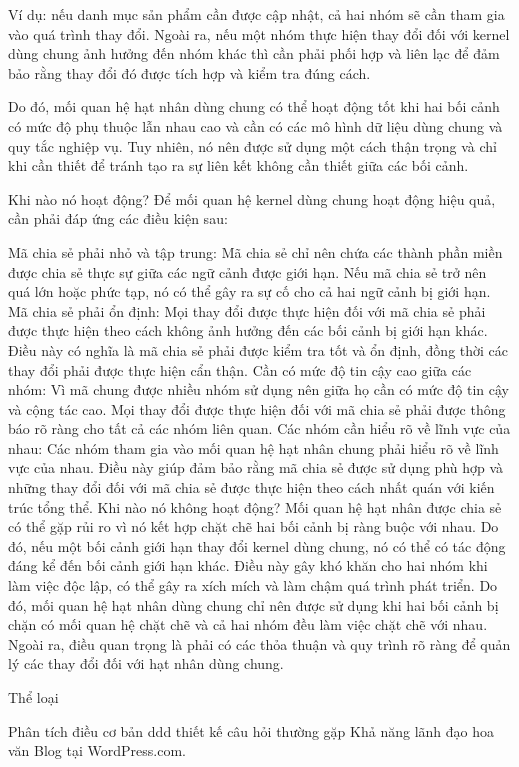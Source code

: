 Ví dụ: nếu danh mục sản phẩm cần được cập nhật, cả hai nhóm sẽ cần tham gia vào quá trình thay đổi. Ngoài ra, nếu một nhóm thực hiện thay đổi đối với kernel dùng chung ảnh hưởng đến nhóm khác thì cần phải phối hợp và liên lạc để đảm bảo rằng thay đổi đó được tích hợp và kiểm tra đúng cách.

Do đó, mối quan hệ hạt nhân dùng chung có thể hoạt động tốt khi hai bối cảnh có mức độ phụ thuộc lẫn nhau cao và cần có các mô hình dữ liệu dùng chung và quy tắc nghiệp vụ. Tuy nhiên, nó nên được sử dụng một cách thận trọng và chỉ khi cần thiết để tránh tạo ra sự liên kết không cần thiết giữa các bối cảnh.

Khi nào nó hoạt động?
Để mối quan hệ kernel dùng chung hoạt động hiệu quả, cần phải đáp ứng các điều kiện sau:

Mã chia sẻ phải nhỏ và tập trung: Mã chia sẻ chỉ nên chứa các thành phần miền được chia sẻ thực sự giữa các ngữ cảnh được giới hạn. Nếu mã chia sẻ trở nên quá lớn hoặc phức tạp, nó có thể gây ra sự cố cho cả hai ngữ cảnh bị giới hạn.
Mã chia sẻ phải ổn định: Mọi thay đổi được thực hiện đối với mã chia sẻ phải được thực hiện theo cách không ảnh hưởng đến các bối cảnh bị giới hạn khác. Điều này có nghĩa là mã chia sẻ phải được kiểm tra tốt và ổn định, đồng thời các thay đổi phải được thực hiện cẩn thận.
Cần có mức độ tin cậy cao giữa các nhóm: Vì mã chung được nhiều nhóm sử dụng nên giữa họ cần có mức độ tin cậy và cộng tác cao. Mọi thay đổi được thực hiện đối với mã chia sẻ phải được thông báo rõ ràng cho tất cả các nhóm liên quan.
Các nhóm cần hiểu rõ về lĩnh vực của nhau: Các nhóm tham gia vào mối quan hệ hạt nhân chung phải hiểu rõ về lĩnh vực của nhau. Điều này giúp đảm bảo rằng mã chia sẻ được sử dụng phù hợp và những thay đổi đối với mã chia sẻ được thực hiện theo cách nhất quán với kiến ​​trúc tổng thể.
Khi nào nó không hoạt động?
Mối quan hệ hạt nhân được chia sẻ có thể gặp rủi ro vì nó kết hợp chặt chẽ hai bối cảnh bị ràng buộc với nhau. Do đó, nếu một bối cảnh giới hạn thay đổi kernel dùng chung, nó có thể có tác động đáng kể đến bối cảnh giới hạn khác. Điều này gây khó khăn cho hai nhóm khi làm việc độc lập, có thể gây ra xích mích và làm chậm quá trình phát triển. Do đó, mối quan hệ hạt nhân dùng chung chỉ nên được sử dụng khi hai bối cảnh bị chặn có mối quan hệ chặt chẽ và cả hai nhóm đều làm việc chặt chẽ với nhau. Ngoài ra, điều quan trọng là phải có các thỏa thuận và quy trình rõ ràng để quản lý các thay đổi đối với hạt nhân dùng chung.


Thể loại

Phân tích
điều cơ bản
ddd
thiết kế
câu hỏi thường gặp
Khả năng lãnh đạo
hoa văn
Blog tại WordPress.com.
